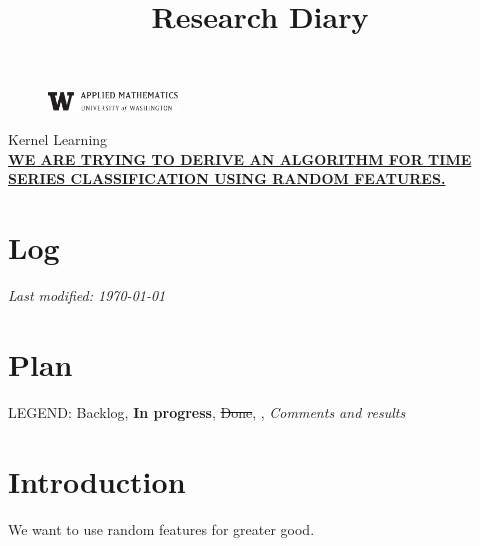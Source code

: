 \documentclass[11pt,letterpaper]{article}
\newcommand{\projectNameShort}{Kernel Learning}
\newcommand{\projectNameLong}{We are trying to derive an algorithm for time series classification using random features.}
\newcommand{\univlogo}{%
  \noindent %
  \begin{figure}
    \vspace{-24pt}
    \begin{center}
      \includegraphics[width=0.31\textwidth]{Images/univ-logo.jpg}
    \end{center}
    \vspace{-10pt}
  \end{figure}
}
\numberwithin{equation}{section} %
\numberwithin{figure}{section} %
\numberwithin{table}{section} %
\begin{document}
\title{Research Diary}
\univlogo
{\Huge \projectNameShort}\\[2mm]

{\large \underline{\textbf{\uppercase{\projectNameLong}}}}\\

\section*{Log}
\textit{Last modified: \today}

\section*{Plan}
LEGEND: Backlog, \textbf{In progress}, \sout{Done}, , \textit{Comments and results}

\listoftodos

\newpage

\section*{Introduction} 
We want to use random features \cite{RahimiRecht2008RandomFeatures} for greater good. 
\end{document}
